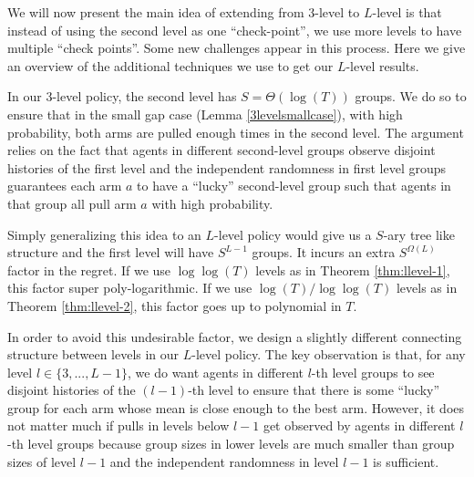 We will now present the main idea of extending from 3-level to
$L$-level is that instead of using the second level as one
``check-point'', we use more levels to have multiple ``check points''.
Some new challenges appear in this process. Here we give an overview
of the additional techniques we use to get our $L$-level results.

 In our 3-level
policy, the second level has $S = \Theta(\log(T))$ groups. We do so to
ensure that in the small gap case (Lemma \ref{3levelsmallcase}), with
high probability, both arms are pulled enough times in the second
level. The argument relies on the fact that agents in different
second-level groups observe disjoint histories of the first level and
the independent randomness in first level groups guarantees each arm
$a$ to have a ``lucky'' second-level group such that agents in that
group all pull arm $a$ with high probability.

Simply generalizing this idea to an $L$-level policy would give us a $S$-ary tree like structure and the first level will have $S^{L-1}$ groups. It incurs an extra $S^{\Omega(L)}$ factor in the regret. If we use $\log\log(T)$ levels as in Theorem \ref{thm:llevel-1}, this factor super poly-logarithmic. If we use $\log(T)/\log\log(T)$ levels as in Theorem \ref{thm:llevel-2}, this factor goes up to polynomial in $T$. 

In order to avoid this undesirable factor, we design a slightly different connecting structure between levels in our $L$-level policy. The key observation is that, for any level $l \in \{3,...,L-1\}$, we do want agents in different $l$-th level groups to see disjoint histories of the $(l-1)$-th level to ensure that there is some ``lucky'' group for each arm whose mean is close enough to the best arm. However, it does not matter much if pulls in levels below $l-1$ get observed by agents in different $l$-th level groups because group sizes in lower levels are much smaller than group sizes of level $l-1$ and the independent randomness in level $l-1$ is sufficient.


